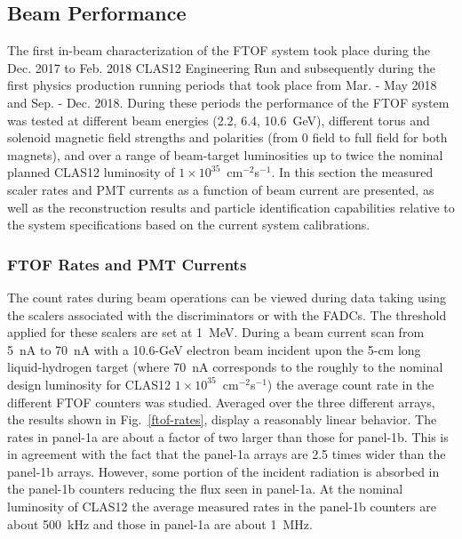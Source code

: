 \documentclass{elsart}
\begin{document}
\subsection{Beam Performance}  
\label{sec:beam}

The first in-beam characterization of the FTOF system took place during the Dec. 2017 to Feb. 2018
CLAS12 Engineering Run and subsequently during the first physics production running periods that took
place from Mar. - May 2018 and Sep. - Dec. 2018. During these periods the performance of the FTOF
system was tested at different beam energies (2.2, 6.4, 10.6~GeV), different torus and solenoid magnetic
field strengths and polarities (from 0 field to full field for both magnets), and over a range of beam-target
luminosities up to twice the nominal planned CLAS12 luminosity of $1 \times 10^{35}$~cm$^{-2}$s$^{-1}$.
In this section the measured scaler rates and PMT currents as a function of beam current are presented,
as well as the reconstruction results and particle identification capabilities relative to the system
specifications based on the current system calibrations.

\subsubsection{FTOF Rates and PMT Currents}

The count rates during beam operations can be viewed during data taking using the scalers associated
with the discriminators or with the FADCs. The threshold applied for these scalers are set at 1~MeV.
During a beam current scan from 5~nA to 70~nA with a 10.6-GeV electron beam incident upon the 5-cm long
liquid-hydrogen target (where 70~nA corresponds to the roughly to the nominal design luminosity for CLAS12
$1 \times 10^{35}$~cm$^{-2}$s$^{-1}$) the average count rate in the different FTOF counters was studied.
Averaged over the three different arrays, the results shown in Fig.~\ref{ftof-rates}, display a reasonably
linear behavior. The rates in panel-1a are about a factor of two larger than those for panel-1b. This is in
agreement with the fact that the panel-1a arrays are 2.5 times wider than the panel-1b arrays. However, some
portion of the incident radiation is absorbed in the panel-1b counters reducing the flux seen in panel-1a. At the
nominal luminosity of CLAS12 the average measured rates in the panel-1b counters are about 500~kHz and
those in panel-1a are about 1~MHz.
\end{document}
